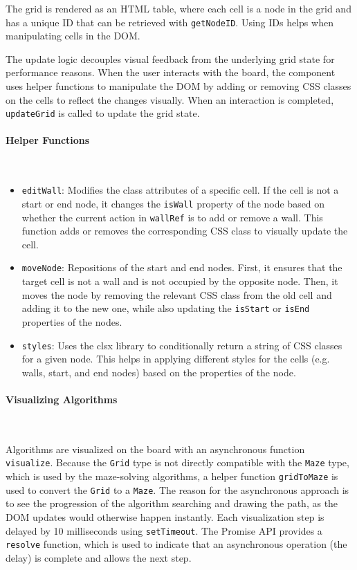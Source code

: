 The grid is rendered as an HTML table, where each cell is a node in the grid and has a unique ID that can be retrieved with \texttt{getNodeID}. Using IDs helps when manipulating cells in the DOM.

The update logic decouples visual feedback from the underlying grid state for performance reasons. When the user interacts with the board, the component uses helper functions to manipulate the DOM by adding or removing CSS classes on the cells to reflect the changes visually. When an interaction is completed, \texttt{updateGrid} is called to update the grid state.

\paragraph{Helper Functions} \

\begin{itemize}
    \item \texttt{editWall}: Modifies the class attributes of a specific cell. If the cell is not a start or end node, it changes the \texttt{isWall} property of the node based on whether the current action in \texttt{wallRef} is to add or remove a wall. This function adds or removes the corresponding CSS class to visually update the cell.
    \item \texttt{moveNode}: Repositions of the start and end nodes. First, it ensures that the target cell is not a wall and is not occupied by the opposite node. Then, it moves the node by removing the relevant CSS class from the old cell and adding it to the new one, while also updating the \texttt{isStart} or \texttt{isEnd} properties of the nodes.
    \item \texttt{styles}: Uses the clsx library to conditionally return a string of CSS classes for a given node. This helps in applying different styles for the cells (e.g. walls, start, and end nodes) based on the properties of the node.
\end{itemize}

\paragraph{Visualizing Algorithms} \

Algorithms are visualized on the board with an asynchronous function \texttt{visualize}. Because the \texttt{Grid} type is not directly compatible with the \texttt{Maze} type, which is used by the maze-solving algorithms, a helper function \texttt{gridToMaze} is used to convert the \texttt{Grid} to a \texttt{Maze}. The reason for the asynchronous approach is to see the progression of the algorithm searching and drawing the path, as the DOM updates would otherwise happen instantly. Each visualization step is delayed by 10 milliseconds using \texttt{setTimeout}. The Promise API provides a \texttt{resolve} function, which is used to indicate that an asynchronous operation (the delay) is complete and allows the next step.


